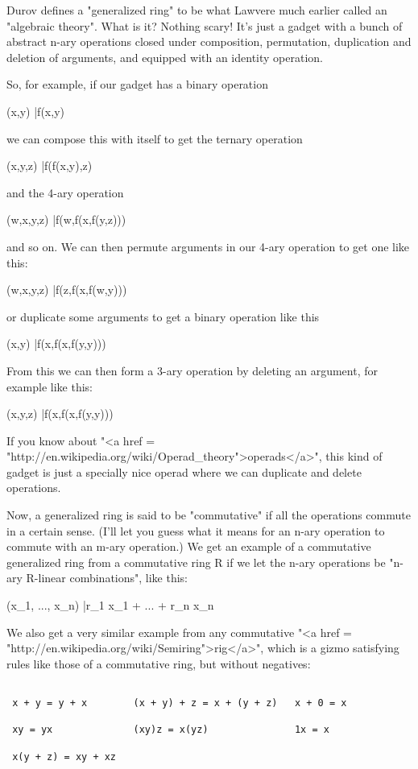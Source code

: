 Durov defines a "generalized ring" to be what Lawvere much
earlier called an "algebraic theory".  What is it?  Nothing
scary!  It's just a gadget with a bunch of abstract n-ary operations
closed under composition, permutation, duplication and deletion of
arguments, and equipped with an identity operation.

So, for example, if our gadget has a binary operation 

(x,y) |\to  f(x,y)

we can compose this with itself to get the ternary operation

(x,y,z) |\to  f(f(x,y),z)

and the 4-ary operation

(w,x,y,z) |\to  f(w,f(x,f(y,z)))

and so on.  We can then permute arguments in our 4-ary operation
to get one like this:

(w,x,y,z) |\to  f(z,f(x,f(w,y)))

or duplicate some arguments to get a binary operation like this

(x,y) |\to  f(x,f(x,f(y,y)))

From this we can then form a 3-ary operation by deleting an argument,
for example like this:

(x,y,z) |\to  f(x,f(x,f(y,y)))

If you know about 
"<a href = "http://en.wikipedia.org/wiki/Operad_theory">operads</a>",
this kind of gadget is just a specially 
nice operad where we can duplicate and delete operations.  
 
Now, a generalized ring is said to be "commutative" if all the 
operations commute in a certain sense.  (I'll let you guess what
it means for an n-ary operation to commute with an m-ary operation.)
We get an example of a commutative generalized ring from a commutative 
ring R if we let the n-ary operations be "n-ary R-linear 
combinations", like this:

(x_{1}, ..., x_{n}) |\to  r_{1} x_{1} + 
... + r_{n} x_{n}           

We also get a very similar example from any commutative "<a href =
"http://en.wikipedia.org/wiki/Semiring">rig</a>",
which is a gizmo satisfying rules like those of a commutative ring,
but without negatives:


\begin{verbatim}

 x + y = y + x        (x + y) + z = x + (y + z)   x + 0 = x

 xy = yx              (xy)z = x(yz)               1x = x

 x(y + z) = xy + xz 
\end{verbatim}
    

